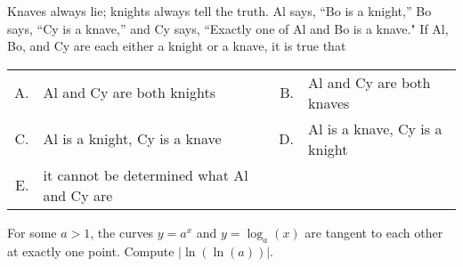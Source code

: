 \begin{problem}
    Knaves always lie; knights always tell the truth. Al says, “Bo is a knight,” Bo says, “Cy is a knave,” and Cy says, “Exactly one of Al and Bo is a knave." If Al, Bo, and Cy are each either a knight or a knave, it is true that
\end{problem}\smallbreak\vspace{2pt}
\begin{tabular}{r@{ }l @{\hskip 1cm} r@{ }l}
    A. & Al and Cy are both knights  & B. & Al and Cy are both knaves \\
    C. & Al is a knight, Cy is a knave  & D. & Al is a knave, Cy is a knight \\
    E. & it cannot be determined what Al and Cy are &
\end{tabular}

\begin{problem}
    For some $a > 1$, the curves $y = a^x$ and $y = \log_a(x)$ are tangent to each other at exactly one point. Compute $| \ln(\ln(a))|$.
\end{problem}


